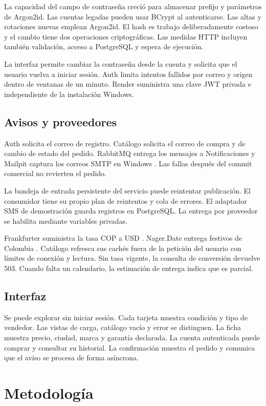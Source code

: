 \documentclass[conference]{IEEEtran}
\begin{document}
La capacidad del campo de contraseña creció para almacenar prefijo y parámetros de Argon2id. Las cuentas legadas pueden usar BCrypt al autenticarse. Las altas y rotaciones nuevas emplean Argon2id. El hash es trabajo deliberadamente costoso y el cambio tiene dos operaciones criptográficas. Las medidas HTTP incluyen también validación, acceso a PostgreSQL y espera de ejecución.

La interfaz permite cambiar la contraseña desde la cuenta y solicita que el usuario vuelva a iniciar sesión. Auth limita intentos fallidos por correo y origen dentro de ventanas de un minuto. Render suministra una clave JWT privada e independiente de la instalación Windows.

\subsection{Avisos y proveedores}
Auth solicita el correo de registro. Catálogo solicita el correo de compra y de cambio de estado del pedido. RabbitMQ entrega los mensajes a Notificaciones \cite{rabbit} y Mailpit captura los correos SMTP en Windows \cite{mailpit}. Las fallas después del commit comercial no revierten el pedido.

La bandeja de entrada persistente del servicio puede reintentar publicación. El consumidor tiene su propio plan de reintentos y cola de errores. El adaptador SMS de demostración guarda registros en PostgreSQL. La entrega por proveedor se habilita mediante variables privadas.

Frankfurter suministra la tasa COP a USD \cite{fx}. Nager.Date entrega festivos de Colombia \cite{nager}. Catálogo refresca sus cachés fuera de la petición del usuario con límites de conexión y lectura. Sin tasa vigente, la consulta de conversión devuelve 503. Cuando falta un calendario, la estimación de entrega indica que es parcial.

\subsection{Interfaz}
Se puede explorar sin iniciar sesión. Cada tarjeta muestra condición y tipo de vendedor. Las vistas de carga, catálogo vacío y error se distinguen. La ficha muestra precio, ciudad, marca y garantía declarada. La cuenta autenticada puede comprar y consultar su historial. La confirmación muestra el pedido y comunica que el aviso se procesa de forma asíncrona.

\clearpage
\section{Metodología}
\end{document}
